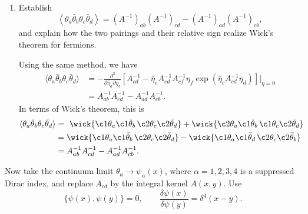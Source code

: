 \begin{enumerate}[label=\alph*)]
    \item Establish
    \begin{equation}
        \left\langle
            \theta_a\bar\theta_b\theta_c\bar\theta_d
        \right\rangle
        =(A^{-1})_{ab}(A^{-1})_{cd}
        -(A^{-1})_{ad}(A^{-1})_{cb},
    \end{equation}
    and explain how the two pairings and their relative sign realize Wick's
    theorem for fermions.
    \begin{solution}
        Using the same method, we have
        \begin{equation}
            \begin{aligned}
                \langle \theta_a \bar \theta_b \theta_c \bar \theta_d\rangle &= -\frac{\partial^2}{\partial\bar \eta_a\partial\eta_b}\left[A_{cd}^{-1} - \bar \eta_e A^{-1}_{ed}A_{cf}^{-1}\eta_f\exp(\bar{\eta}_cA_{cd}^{-1}\eta_d)\right]\bigg|_{\eta=0}\\
                &=A_{ab}^{-1}A_{cd}^{-1} - A_{ad}^{-1} A_{cb}^{-1}.
            \end{aligned}
        \end{equation}
        In terms of Wick's theorem, this is
\begin{equation}
    \begin{aligned}
        \langle \theta_a \bar\theta_b \theta_c \bar\theta_d\rangle&=\
                \wick{
            \c1{\theta_a}\c1{\bar\theta_b}\,
            \c2{\theta_c}\c2{\bar\theta_d}
        }
        +
\wick{
            \c2{\theta_a}\c1{\bar\theta_b}\,
            \c1{\theta_c}\c2{\bar\theta_d}
        }
        \\
        &=
        \wick{
            \c1{\theta_a}\c1{\bar\theta_b}\,
            \c2{\theta_c}\c2{\bar\theta_d}
        }
        -
        \wick{
            \c1{\theta_a}\c1{\bar\theta_d}\,
            \c2{\theta_c}\c2{\bar\theta_b}
        }
        \\
        &=
        A^{-1}_{ab}A^{-1}_{cd}
        -
        A^{-1}_{ad}A^{-1}_{cb}.
    \end{aligned}
\end{equation}
    \end{solution}
\end{enumerate}

Now take the continuum limit $\theta_a\to\psi_\alpha(x)$, where
$\alpha=1,2,3,4$ is a suppressed Dirac index, and replace $A_{cd}$ by the
integral kernel $A(x,y)$. Use
\begin{equation}
    \{\psi(x),\psi(y)\}=0,
    \qquad
    \frac{\delta\psi(x)}{\delta\psi(y)}=\delta^4(x-y).
\end{equation}

